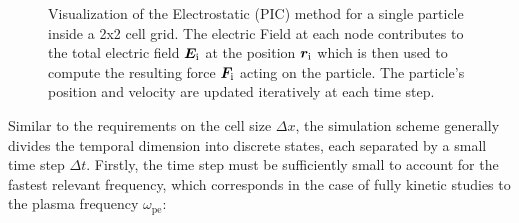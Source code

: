 \begin{figure}[H]
    \caption{Visualization of the Electrostatic (\acs{PIC}) method for a single particle inside a 2x2 cell grid. The electric Field at each node contributes to the total electric field $\bm{E}_\mathrm{i}$ at the position $\bm{r}_\mathrm{i}$ which is then used to compute the resulting force $\bm{F}_\mathrm{i}$ acting on the particle. The particle's position and velocity are updated iteratively at each time step.}
    \label{fig:grid}
\end{figure}

Similar to the requirements on the cell size $\Delta x$, the simulation scheme generally divides the temporal dimension into discrete states, each separated by a small time step $\Delta t$. Firstly, the time step must be sufficiently small to account for the fastest relevant frequency, which corresponds in the case of fully kinetic studies to the plasma frequency $\omega_\mathrm{pe}$:

